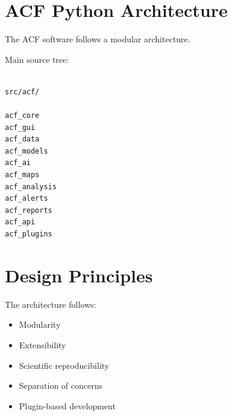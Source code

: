 \section{ACF Python Architecture}


The ACF software follows a modular architecture.


Main source tree:


\begin{verbatim}

src/acf/

acf_core
acf_gui
acf_data
acf_models
acf_ai
acf_maps
acf_analysis
acf_alerts
acf_reports
acf_api
acf_plugins

\end{verbatim}



\section{Design Principles}


The architecture follows:

\begin{itemize}

\item Modularity

\item Extensibility

\item Scientific reproducibility

\item Separation of concerns

\item Plugin-based development

\end{itemize}
